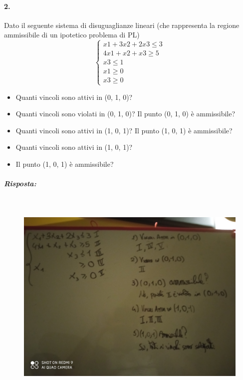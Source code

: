 \paragraph{2.} Dato il seguente sistema di disuguaglianze lineari (che rappresenta la regione ammissibile di un ipotetico problema di PL)
\begin{equation*}
    \begin{cases}
        \text{$x1 + 3x2 + 2x3 \leq 3$}\\
        \text{$4x1 + x2 + x3 \geq 5$}\\
        \text{$x3 \leq 1$}\\
        \text{$x1 \geq 0$}\\
        \text{$x3 \geq 0$}
    \end{cases}
\end{equation*}
\begin{itemize}
    \item Quanti vincoli sono attivi in (0, 1, 0)?
    \item Quanti vincoli sono violati in (0, 1, 0)? Il punto (0, 1, 0) è ammissibile?
    \item Quanti vincoli sono attivi in (1, 0, 1)? Il punto (1, 0, 1) è ammissibile?
    \item Quanti vincoli sono attivi in (1, 0, 1)?
    \item Il punto (1, 0, 1) è ammissibile?
\end{itemize}

\subparagraph{Risposta:} 

\

\begin{figure}[h!]
    \centering
    \includegraphics[scale=0.05]{esercizio1.jpg}
\end{figure}
























